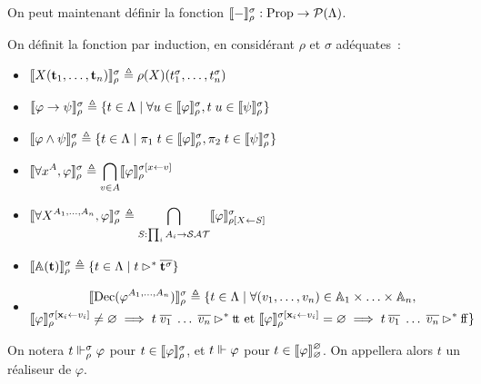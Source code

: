 \documentclass{article}
\begin{document}
On peut maintenant définir la fonction $\llbracket - \rrbracket_\rho^\sigma : \mathrm{Prop} \to \mathcal P(\Lambda)$.

\begin{defi}[Interprétation]
  On définit la fonction par induction, en considérant $\rho$ et $\sigma$ adéquates~:
  \begin{itemize}
  \item $\llbracket X(\mathbf{t}_1,\ldots,\mathbf{t}_n) \rrbracket_\rho^\sigma \triangleq \rho(X)(t_1^\sigma,\ldots,t_n^\sigma)$
  \item $\llbracket \varphi\to\psi \rrbracket_\rho^\sigma\triangleq \{t\in\Lambda\mid \forall u \in \llbracket \varphi \rrbracket_\rho^\sigma, t\;u\in\llbracket \psi \rrbracket_\rho^\sigma\}$
  \item $\llbracket \varphi\land \psi \rrbracket_\rho^\sigma \triangleq \{t\in \Lambda\mid \pi_1\;t\in\llbracket \varphi \rrbracket_\rho^\sigma, \pi_2\;t\in\llbracket \psi \rrbracket_\rho^\sigma\}$
  \item $\displaystyle\llbracket \forall x^A, \varphi \rrbracket_\rho^\sigma \triangleq \bigcap_{v \in A}\llbracket \varphi \rrbracket_\rho^{\sigma[x \leftarrow v]}$
  \item $\displaystyle\llbracket \forall X^{A_1,\ldots,A_n}, \varphi \rrbracket_\rho^\sigma\triangleq\bigcap_{S : \prod_i A_i \to \mathcal {SAT}}\llbracket \varphi \rrbracket_{\rho[X \leftarrow S]}^\sigma$
  \item $\llbracket \mathbb A(\mathbf{t}) \rrbracket_\rho^\sigma \triangleq \{t\in \Lambda\mid t \rhd^* \overline{\mathbf{t}^\sigma}\}$
  \item \begin{multline*}
    \llbracket \mathrm{Dec}(\varphi^{A_1,\ldots,A_n}) \rrbracket_\rho^\sigma \triangleq \{t\in \Lambda\mid
    \forall (v_1,\ldots,v_n)\in \mathbb A_1\times\ldots\times\mathbb A_n, \\
    \llbracket \varphi \rrbracket_\rho^{\sigma[\mathbf{x}_i \leftarrow v_i]}\neq \varnothing \implies t\;\overline{v_1}\;\ldots\;\overline{v_n}\rhd^* \mathrm{t}\!\mathrm{t}\text{ et }\llbracket \varphi \rrbracket_\rho^{\sigma[\mathbf{x}_i \leftarrow v_i]}=\varnothing \implies t\:\overline{v_1}\;\ldots\;\overline{v_n}\rhd^* \mathrm{f}\!\mathrm{f}\}
  \end{multline*}
  \end{itemize}
\end{defi}

\begin{nota}
  On notera $t\Vdash_\rho^\sigma \varphi$ pour $t\in\llbracket \varphi \rrbracket_\rho^\sigma$, et $t\Vdash\varphi$ pour $t\in\llbracket \varphi \rrbracket_\varnothing^\varnothing$. On appellera alors $t$ un réaliseur de $\varphi$.
\end{nota}
\end{document}

